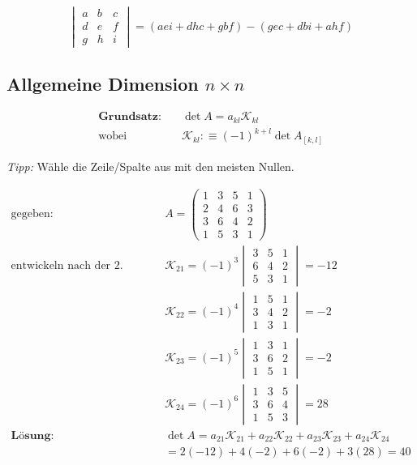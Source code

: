 \documentclass[11pt]{article}
\begin{document}
\begin{equation*}
	\begin{vmatrix}
		a & b & c \\ d & e & f \\ g & h & i
	\end{vmatrix} = (aei + dhc + gbf) - (gec + dbi + ahf)
\end{equation*}

\subsection{Allgemeine Dimension $n\times n$}

\begin{equation*}
\begin{split}
	\textbf{Grundsatz:}\quad & \det A = a_{kl} \mathcal{K}_{kl} \\
	\text{wobei} \quad & \mathcal{K}_{kl} :\equiv (-1)^{k+l} \det A_{[k,l]}
\end{split}
\end{equation*}

\emph{Tipp:} W{\"a}hle die Zeile/Spalte aus mit den meisten Nullen.

\begin{equation*}
\begin{split}
	\text{gegeben:} & \quad A = \begin{pmatrix}
		1 & 3 & 5 & 1 \\ 2 & 4 & 6 & 3 \\ 3 & 6 &4 & 2 \\1 & 5 & 3 & 1
	\end{pmatrix} \\
	\text{entwickeln nach der 2. Zeile:} & \quad \mathcal{K}_{21} = (-1)^3 \begin{vmatrix}
			3 & 5 & 1 \\ 6 &4 & 2 \\ 5 & 3 & 1
	\end{vmatrix} = -12 \\
	& \quad \mathcal{K}_{22} = (-1)^4 \begin{vmatrix}
			1 & 5 & 1 \\ 3 &4 & 2 \\ 1 & 3 & 1
	\end{vmatrix} = -2 \\
	& \quad \mathcal{K}_{23} = (-1)^5 \begin{vmatrix}
			1 & 3 & 1 \\ 3 &6 & 2 \\ 1 & 5 & 1
	\end{vmatrix} = -2 \\
	& \quad \mathcal{K}_{24} = (-1)^6 \begin{vmatrix}
			1 & 3 & 5 \\ 3 &6 & 4 \\ 1 & 5 & 3
	\end{vmatrix} = 28 \\
	\textbf{L{\"o}sung:} & \quad \det A = a_{21}\mathcal{K}_{21} + a_{22}\mathcal{K}_{22} + a_{23}\mathcal{K}_{23} + a_{24}\mathcal{K}_{24} \\
	& \quad =2(-12) + 4(-2) + 6(-2) + 3(28) = 40
\end{split}
\end{equation*}
\end{document}
